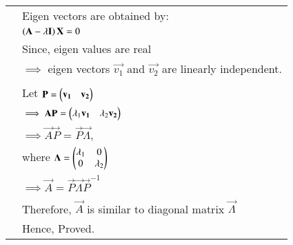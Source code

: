 \documentclass[journal,12pt]{IEEEtran}
\begin{document}
\begin{longtable}{|c|l|}
	& Eigen vectors are obtained by:\\
	& $\left(\mathbf{A}-\lambda \mathbf{I}\right)\mathbf{X}=0$\\
	& Since, eigen values are real\\
	& $\implies$ eigen vectors $\vec{v_1}$ and $\vec{v_2}$ are linearly independent.\\
	&\\
	& Let $\mathbf{P}=\begin{pmatrix}\mathbf{v_1}& \mathbf{v_2}\end{pmatrix}$\\
	& $\implies \mathbf{A}\mathbf{P}=\begin{pmatrix}\lambda_1 \mathbf{v_1}&\lambda_2 \mathbf{v_2}\end{pmatrix}$\\
	& $\implies \vec{A}\vec{P}=\vec{P}\vec{\Lambda}$, \\
	& where $\mathbf{\Lambda}=\begin{pmatrix}\lambda_1&0\\0&\lambda_2\end{pmatrix}$\\
	& $\implies \vec{A}=\vec{P}\vec{\Lambda} \vec{P}^{-1}$\\
	&\\
	& Therefore, $\vec{A}$ is similar to diagonal matrix $\vec{\Lambda}$\\
	& Hence, Proved.
	\hline
\end{longtable}
\end{document}
